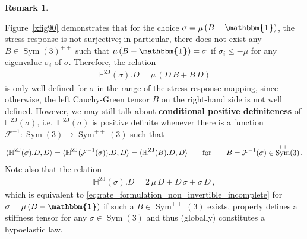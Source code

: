 \documentclass[10pt]{article}
\newcounter{theoremCounter}
\numberwithin{theoremCounter}{section}
\theoremstyle{plain}
\theoremstyle{definition}
\newtheorem{rem}[theoremCounter]{Remark}
\newcommand{\id}{{\boldsymbol{\mathbbm{1}}}}
\DeclareMathOperator{\Sym}{Sym}
\DeclareMathOperator{\ZJ}{ZJ}
\def\H{\mathbb{H}}
\numberwithin{equation}{section}
\begin{document}
\begin{rem}
\begin{figure}[h!]
	\end{figure}
Figure~\ref{xfig90} demonstrates that for the choice $\sigma = \mu \, (B-\id)$, the stress response is not surjective; in particular, there does not exist any $B\in\Sym(3)^{++}$ such that $\mu\,(B-\id)=\sigma$ if $\sigma_i\leq-\mu$ for any eigenvalue $\sigma_i$ of $\sigma$. Therefore, the relation
	\begin{align}
	\label{eq:rate_formulation_non_invertible_incomplete}
	\H^{\ZJ}(\sigma).D = \mu \, (D \, B + B \, D)
	\end{align}
is only well-defined for $\sigma$ in the range of the stress response mapping, since otherwise, the left Cauchy-Green tensor $B$ on the right-hand side is not well defined.
However, we may still talk about \textbf{conditional positive definiteness} of $\H^{\ZJ}(\sigma)$, i.e.\ $\H^{\ZJ}(\sigma)$ is positive definite whenever there is a function $\mathcal{F}^{-1}\colon \Sym(3) \to \Sym^{++}(3)$ such that
	\begin{align}
	\langle \H^{\ZJ}(\sigma).D,D \rangle = \langle \H^{\ZJ}(\mathcal{F}^{-1}(\sigma)).D,D \rangle = \langle \H^{\ZJ}(B).D,D \rangle \qquad \textnormal{for} \qquad B = \mathcal{F}^{-1}(\sigma) \in \Sym^{++}(3)\,.
	\end{align}
Note also that the relation
	\begin{align}
	\H^{\ZJ}(\sigma).D = 2 \, \mu \, D + D \, \sigma + \sigma \, D\,,
	\end{align}
which is equivalent to \eqref{eq:rate_formulation_non_invertible_incomplete} for $\sigma = \mu \, (B-\id)$ if such a $B\in\Sym^{++}(3)$ exists, properly defines a stiffness tensor for any $\sigma\in\Sym(3)$ and thus (globally) constitutes a hypoelastic law.


\end{rem}
\end{document}
